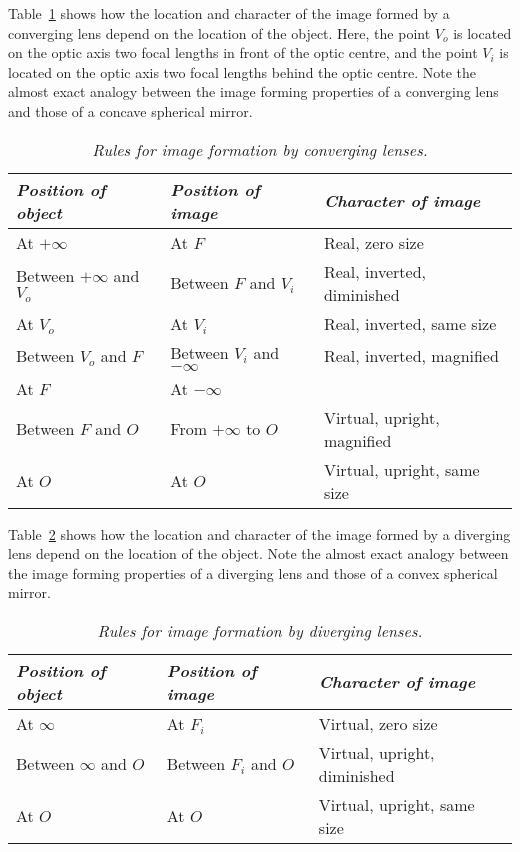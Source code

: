 Table~\ref{t13.3} shows how the location and character of
the image formed by a converging lens depend on the location of the
object. Here, the point $V_o$ is located on the optic axis two focal lengths
in front of the optic centre, and the point $V_i$ is located on the optic
axis two focal lengths behind the optic centre. Note the almost exact analogy between the image forming properties of
a converging lens and those of a concave spherical mirror.
\begin{table}\centering
\begin{tabular}{lll}\hline
{\em Position of object} & {\em Position of image} &
{\em Character of image}\\ \hline
At $+\infty$ & At $F$ & Real, zero size\\
Between $+\infty$ and $V_o$ & Between $F$ and $V_i$ &
Real, inverted, diminished\\
At $V_o$ & At $V_i$ & Real, inverted, same size \\
Between $V_o$ and $F$ & Between $V_i$ and $-\infty$ &
Real, inverted, magnified\\
At $F$ & At $-\infty$ & \\
Between $F$ and $O$ & From $+\infty$ to $O$ & Virtual,
upright, magnified\\
At $O$ & At $O$ & Virtual, upright, same size\\
\end{tabular}
\caption{\em Rules for image formation by converging lenses.}\label{t13.3}
\end{table}

Table~\ref{t13.4} shows how the location and character of
the image formed by a diverging  lens depend on the location of the
object. Note the almost exact analogy between the image forming properties of
a diverging lens and those of a convex spherical mirror.
\begin{table}\centering
\begin{tabular}{lll}\hline
{\em Position of object} & {\em Position of image} &
{\em Character of image}\\ \hline
At $\infty$  & At $F_i$& Virtual, zero size\\
Between $\infty$ and $O$ & Between $F_i$ and $O$ &
Virtual, upright, diminished\\
At $O$ & At $O$ & Virtual, upright, same size\\
\end{tabular}
\caption{\em Rules for image formation by diverging lenses.}\label{t13.4}
\end{table}

